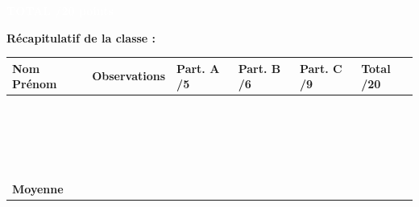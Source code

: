 \documentclass[10pt,a4paper]{article}
\begin{document}
\vspace{6mm}

\noindent\colorbox{grandtotal}{%
  \parbox{\dimexpr\linewidth-2\fboxsep\relax}{%
    \textcolor{white}{\textbf{\Large \hfill TOTAL \hfill /20 points \hfill}}%
  }%
}

\vspace{6mm}

\noindent\textbf{Récapitulatif de la classe :}

\vspace{2mm}

\begin{tabularx}{\linewidth}{|>{\centering\arraybackslash}p{4.5cm}|>{\centering\arraybackslash}X|>{\centering\arraybackslash}p{1.8cm}|>{\centering\arraybackslash}p{1.8cm}|>{\centering\arraybackslash}p{1.8cm}|>{\centering\arraybackslash}p{1.8cm}|}
  \hline
  \rowcolor{exolight}
  \textbf{Nom Prénom} & \textbf{Observations} & \textbf{Part. A /5} & \textbf{Part. B /6} & \textbf{Part. C /9} & \textbf{Total /20} \\
  \hline
  & & & & & \\[6mm]
  \hline
  & & & & & \\[6mm]
  \hline
  & & & & & \\[6mm]
  \hline
  & & & & & \\[6mm]
  \hline
  & & & & & \\[6mm]
  \hline
  & & & & & \\[6mm]
  \hline
  & & & & & \\[6mm]
  \hline
  & & & & & \\[6mm]
  \hline
  & & & & & \\[6mm]
  \hline
  & & & & & \\[6mm]
  \hline
  & & & & & \\[6mm]
  \hline
  & & & & & \\[6mm]
  \hline
  & & & & & \\[6mm]
  \hline
  & & & & & \\[6mm]
  \hline
  & & & & & \\[6mm]
  \hline
  & & & & & \\[6mm]
  \hline
  & & & & & \\[6mm]
  \hline
  & & & & & \\[6mm]
  \hline
  & & & & & \\[6mm]
  \hline
  & & & & & \\[6mm]
  \hline
  \rowcolor{totalrow}
  \textbf{Moyenne} & & & & & \\
  \hline
\end{tabularx}
\end{document}
